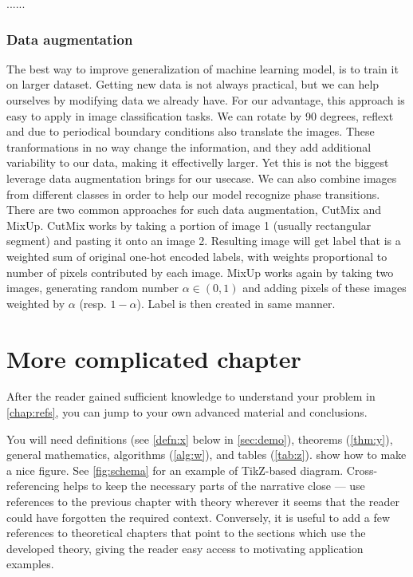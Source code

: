 ......

\subsection{Data augmentation}

The best way to improve generalization of machine learning model, is to train it on larger dataset. Getting new data is not always practical, but we can help ourselves by modifying data we already have. For our advantage, this approach is easy to apply in image classification tasks. We can rotate by 90 degrees, reflext and due to periodical boundary conditions also translate the images. These tranformations in no way change the information, and they add additional variability to our data, making it effectivelly larger. Yet this is not the biggest leverage data augmentation brings for our usecase. We can also combine images from different classes in order to help our model recognize phase transitions. There are two common approaches for such data augmentation, CutMix and MixUp. CutMix works by taking a portion of image 1 (usually rectangular segment) and pasting it onto an image 2. Resulting image will get label that is a weighted sum of original one-hot encoded labels, with weights proportional to number of pixels contributed by each image. MixUp works again by taking two images, generating random number $\alpha \in (0, 1)$ and adding pixels of these images weighted by $\alpha$ (resp. $1 - \alpha$). Label is then created in same manner.


\chapter{More complicated chapter}
\label{chap:math}

After the reader gained sufficient knowledge to understand your problem in \cref{chap:refs}, you can jump to your own advanced material and conclusions.

You will need definitions (see \cref{defn:x} below in \cref{sec:demo}), theorems (\cref{thm:y}), general mathematics, algorithms (\cref{alg:w}), and tables (\cref{tab:z}).  show how to make a nice figure. See \cref{fig:schema} for an example of TikZ-based diagram. Cross-referencing helps to keep the necessary parts of the narrative close --- use references to the previous chapter with theory wherever it seems that the reader could have forgotten the required context. Conversely, it is useful to add a few references to theoretical chapters that point to the sections which use the developed theory, giving the reader easy access to motivating application examples.


